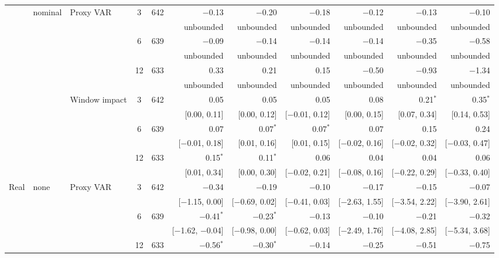 \begin{table}[tp]
{\begin{tabular}{lllcrrrrrrr}
 & nominal & Proxy VAR & 3 & 642 & $-$0.13 & $-$0.20 & $-$0.18 & $-$0.12 & $-$0.13 & $-$0.10\\
 & & & & & {\tiny unbounded} & {\tiny unbounded} & {\tiny unbounded} & {\tiny unbounded} & {\tiny unbounded} & {\tiny unbounded}\\
 &  &  & 6 & 639 & $-$0.09 & $-$0.14 & $-$0.14 & $-$0.14 & $-$0.35 & $-$0.58\\
 & & & & & {\tiny unbounded} & {\tiny unbounded} & {\tiny unbounded} & {\tiny unbounded} & {\tiny unbounded} & {\tiny unbounded}\\
 &  &  & 12 & 633 & 0.33 & 0.21 & 0.15 & $-$0.50 & $-$0.93 & $-$1.34\\
 & & & & & {\tiny unbounded} & {\tiny unbounded} & {\tiny unbounded} & {\tiny unbounded} & {\tiny unbounded} & {\tiny unbounded}\\
 &  & Window impact & 3 & 642 & 0.05 & 0.05 & 0.05 & 0.08 & 0.21$^{*}$ & 0.35$^{*}$\\
 & & & & & {\tiny [0.00, 0.11]} & {\tiny [0.00, 0.12]} & {\tiny [$-$0.01, 0.12]} & {\tiny [0.00, 0.15]} & {\tiny [0.07, 0.34]} & {\tiny [0.14, 0.53]}\\
 &  &  & 6 & 639 & 0.07 & 0.07$^{*}$ & 0.07$^{*}$ & 0.07 & 0.15 & 0.24\\
 & & & & & {\tiny [$-$0.01, 0.18]} & {\tiny [0.01, 0.16]} & {\tiny [0.01, 0.15]} & {\tiny [$-$0.02, 0.16]} & {\tiny [$-$0.02, 0.32]} & {\tiny [$-$0.03, 0.47]}\\
 &  &  & 12 & 633 & 0.15$^{*}$ & 0.11$^{*}$ & 0.06 & 0.04 & 0.04 & 0.06\\
 & & & & & {\tiny [0.01, 0.34]} & {\tiny [0.00, 0.30]} & {\tiny [$-$0.02, 0.21]} & {\tiny [$-$0.08, 0.16]} & {\tiny [$-$0.22, 0.29]} & {\tiny [$-$0.33, 0.40]}\\
\addlinespace
Real & none & Proxy VAR & 3 & 642 & $-$0.34 & $-$0.19 & $-$0.10 & $-$0.17 & $-$0.15 & $-$0.07\\
 & & & & & {\tiny [$-$1.15, 0.00]} & {\tiny [$-$0.69, 0.02]} & {\tiny [$-$0.41, 0.03]} & {\tiny [$-$2.63, 1.55]} & {\tiny [$-$3.54, 2.22]} & {\tiny [$-$3.90, 2.61]}\\
 &  &  & 6 & 639 & $-$0.41$^{*}$ & $-$0.23$^{*}$ & $-$0.13 & $-$0.10 & $-$0.21 & $-$0.32\\
 & & & & & {\tiny [$-$1.62, $-$0.04]} & {\tiny [$-$0.98, 0.00]} & {\tiny [$-$0.62, 0.03]} & {\tiny [$-$2.49, 1.76]} & {\tiny [$-$4.08, 2.85]} & {\tiny [$-$5.34, 3.68]}\\
 &  &  & 12 & 633 & $-$0.56$^{*}$ & $-$0.30$^{*}$ & $-$0.14 & $-$0.25 & $-$0.51 & $-$0.75\\

\end{tabular}}
\end{table}
